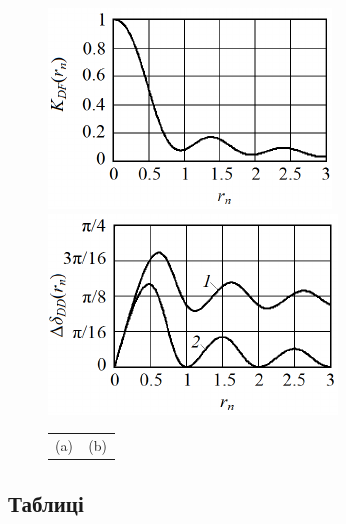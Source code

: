 \begin{multicols}{2}
\begin{figure}\centering
	\includegraphics[width=0.4\linewidth]{fig2a}
	~~~~~
	\includegraphics[width=0.4\linewidth]{fig2b}
	\begin{tabular}{p{0.49\linewidth}p{0.49\linewidth}}
		\centering (a) & \centering (b)  
	\end{tabular}	
	\label{fig2}%
\end{figure}



\subsection{Таблиці}


\end{multicols}
